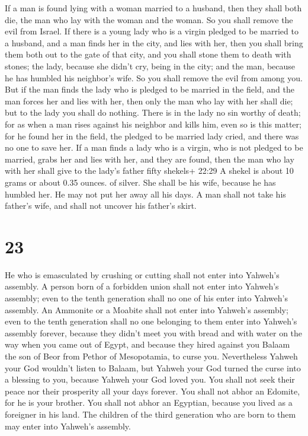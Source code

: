  If a man is found lying with a woman married to a husband,
then they shall both die, the man who lay with the woman and the woman.
So you shall remove the evil from Israel.  If there is a
young lady who is a virgin pledged to be married to a husband, and a man
finds her in the city, and lies with her,  then you shall
bring them both out to the gate of that city, and you shall stone them
to death with stones; the lady, because she didn't cry, being in the
city; and the man, because he has humbled his neighbor's wife. So you
shall remove the evil from among you.  But if the man finds
the lady who is pledged to be married in the field, and the man forces
her and lies with her, then only the man who lay with her shall die;
 but to the lady you shall do nothing. There is in the lady
no sin worthy of death; for as when a man rises against his neighbor and
kills him, even so is this matter;  for he found her in the
field, the pledged to be married lady cried, and there was no one to
save her.  If a man finds a lady who is a virgin, who is
not pledged to be married, grabs her and lies with her, and they are
found,  then the man who lay with her shall give to the
lady's father fifty shekels+ 22:29 A shekel is about 10 grams or about
0.35 ounces. of silver. She shall be his wife, because he has humbled
her. He may not put her away all his days.  A man shall not
take his father's wife, and shall not uncover his father's skirt.

\hypertarget{section-22}{%
\section{23}\label{section-22}}

 He who is emasculated by crushing or cutting shall not
enter into Yahweh's assembly.  A person born of a forbidden
union shall not enter into Yahweh's assembly; even to the tenth
generation shall no one of his enter into Yahweh's assembly.
 An Ammonite or a Moabite shall not enter into Yahweh's
assembly; even to the tenth generation shall no one belonging to them
enter into Yahweh's assembly forever,  because they didn't
meet you with bread and with water on the way when you came out of
Egypt, and because they hired against you Balaam the son of Beor from
Pethor of Mesopotamia, to curse you.  Nevertheless Yahweh
your God wouldn't listen to Balaam, but Yahweh your God turned the curse
into a blessing to you, because Yahweh your God loved you. 
You shall not seek their peace nor their prosperity all your days
forever.  You shall not abhor an Edomite, for he is your
brother. You shall not abhor an Egyptian, because you lived as a
foreigner in his land.  The children of the third generation
who are born to them may enter into Yahweh's assembly.

